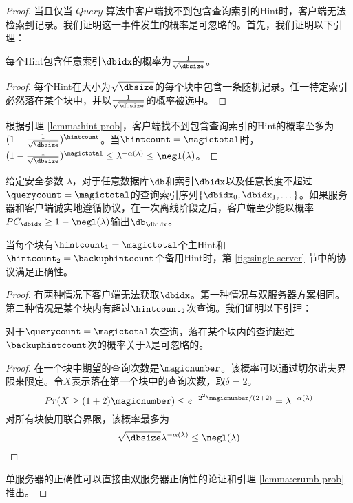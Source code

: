 \begin{proof}
    当且仅当 $Query$ 算法中客户端找不到包含查询索引的Hint时，客户端无法检索到记录。我们证明这一事件发生的概率是可忽略的。首先，我们证明以下引理：

    \begin{lemma}
    \label{lemma:hint-prob}
        每个Hint包含任意索引$\dbidx$的概率为$\frac{1}{\sqrt{\dbsize}}$。
    \end{lemma}

    \begin{proof}
    每个Hint在大小为$\sqrt{\dbsize}$的每个块中包含一条随机记录。任一特定索引必然落在某个块中，并以$\frac{1}{\sqrt{\dbsize}}$的概率被选中。
    \end{proof}

    根据引理 \ref{lemma:hint-prob}，客户端找不到包含查询索引的Hint的概率至多为$(1-\frac{1}{\sqrt{\dbsize}})^\hintcount$。当$\hintcount=\magictotal$时，$(1-\frac{1}{\sqrt{\dbsize}})^{\magictotal}\le \lambda^{-\alpha(\lambda)} \le \negl(\lambda)$。
\end{proof}

\begin{definition}[单服务器方案的正确性]
给定安全参数 $\lambda$，对于任意数据库$\db$和索引$\dbidx$以及任意长度不超过$\querycount=\magictotal$的查询索引序列$\{\dbidx_0,\dbidx_1, \dots\}$。如果服务器和客户端诚实地遵循协议，在一次离线阶段之后，客户端至少能以概率$PC_\dbidx \geq 1-\negl(\lambda)$输出$\db_\dbidx$。
\end{definition}

\begin{theorem}
    当每个块有$\hintcount_1=\magictotal$个主Hint和$\hintcount_2 = \backuphintcount$个备用Hint时，第 \ref{fig:single-server} 节中的协议满足正确性。
\end{theorem}

\begin{proof}
有两种情况下客户端无法获取$\dbidx$。第一种情况与双服务器方案相同。第二种情况是某个块内有超过$\hintcount_2$次查询。我们证明以下引理：

\begin{lemma}
\label{lemma:crumb-prob}
    对于$\querycount=\magictotal$次查询，落在某个块内的查询超过$\backuphintcount$次的概率关于$\lambda$是可忽略的。
\end{lemma}

\begin{proof}
    在一个块中期望的查询次数是$\magicnumber$。该概率可以通过切尔诺夫界限来限定。令$X$表示落在第一个块中的查询次数，取$\delta=2$。
$$ Pr(X \ge (1+2)\magicnumber) \le e^{-2^2\magicnumber/(2+2)} = \lambda^{-\alpha(\lambda)} $$ 
对所有块使用联合界限，该概率最多为
$$\sqrt{\dbsize}\lambda^{-\alpha(\lambda)} \le \negl(\lambda)$$
\end{proof}

单服务器的正确性可以直接由双服务器正确性的论证和引理 \ref{lemma:crumb-prob} 推出。
\end{proof}

